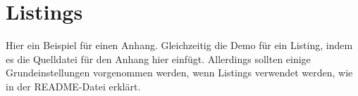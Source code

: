 \section{Listings}
\label{appendix_dummy}
  Hier ein Beispiel für einen Anhang.
  Gleichzeitig die Demo für ein Listing, indem es die Quelldatei für den Anhang hier einfügt.
  Allerdings sollten einige Grundeinstellungen vorgenommen werden, wenn Listings verwendet werden, wie in der README-Datei erklärt.
  